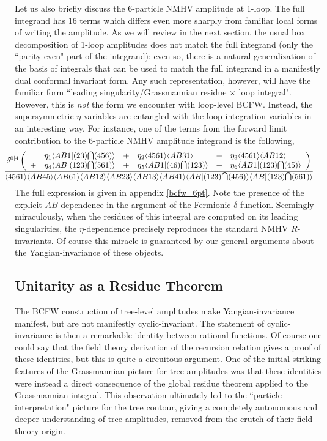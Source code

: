 \documentclass[11pt, reqno]{article}
\renewcommand{\cap}{\mathrm{\raisebox{0.75pt}{{$\,\bigcap\,$}}}}
\newcommand{\ab}[1]{\langle #1\rangle}
\begin{document}
Let us also briefly discuss the 6-particle NMHV amplitude at 1-loop. The full integrand has 16 terms which differs even more sharply from familiar local forms of writing the amplitude. As we will review in the next section, the usual box decomposition of 1-loop amplitudes does not match the full integrand (only the ``parity-even" part of the integrand); even so, there is a natural generalization of the basis of integrals that can be used to match the full integrand in a manifestly dual conformal invariant form. Any such representation, however, will have the familiar form ``leading singularity/Grassmannian residue $\times$ loop integral". However, this is {\it not} the form we encounter with loop-level BCFW. Instead, the supersymmetric $\eta$-variables are entangled with the loop integration variables in an interesting way. For instance, one of the terms from the forward limit contribution to the 6-particle NMHV amplitude integrand is the following,
\begin{align*}
&\hspace{-0.5cm}\frac{\delta^{0|4}\left(\begin{array}{llllll}& \eta_1\ab{AB1|(23)\!\cap\!(456)}&+& \eta_2\ab{4561}\ab{AB31}&+& \eta_3\ab{4561} \ab{AB12}\\+& \eta_4\ab{AB|(123)\!\cap\!(561)}&+& \eta_5\ab{AB1|(46)\!\cap\!(123)}&+& \eta_6\ab{AB1|(123)\!\cap\!(45)}\end{array}\right)}{\ab{4561} \ab{AB45} \ab{AB61}\ab{AB12}\ab{AB23} \ab{AB13} \ab{AB41}\ab{AB|(123)\!\cap\!(456)} \ab{AB|(123)\!\cap\!(561)}}
\end{align*}
The full expression is given in appendix \ref{bcfw_6pt}.
Note the presence of the explicit $AB$-dependence in the argument of the Fermionic $\delta$-function. Seemingly miraculously, when the residues of this integral are computed on its leading singularities, the $\eta$-dependence precisely reproduces the standard NMHV $R$-invariants. Of course this miracle is guaranteed by our general arguments about the Yangian-invariance of these objects.



\subsection{Unitarity as a Residue Theorem}



The BCFW construction of tree-level amplitudes make Yangian-invariance manifest, but are not manifestly cyclic-invariant. The statement of cyclic-invariance is then a remarkable identity between rational functions. Of course one could say that the field theory derivation of the recursion relation gives a proof of these identities, but this is quite a circuitous argument. One of the initial striking features of the Grassmannian picture for tree amplitudes was that these identities were instead a direct consequence of the global residue theorem applied to the Grassmannian integral. This observation ultimately led to the ``particle interpretation" picture for the tree contour, giving a completely autonomous and deeper understanding of tree amplitudes, removed from the crutch of their field theory origin.
\end{document}
